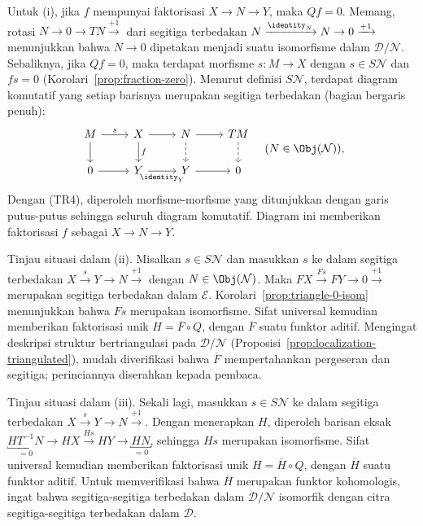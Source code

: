 \begin{bukti}
	Untuk (i), jika $f$ mempunyai faktorisasi $X \to N \to Y$, maka $Qf = 0$.
	Memang, rotasi $N \to 0 \to TN \xrightarrow{+1}$ dari segitiga terbedakan
	$N \xrightarrow{\identity_N} N \to 0 \xrightarrow{+1}$ menunjukkan bahwa
	$N \to 0$ dipetakan menjadi suatu isomorfisme dalam
	$\mathcal{D}/\mathcal{N}$. Sebaliknya, jika $Qf = 0$, maka terdapat morfisme
	$s: M \to X$ dengan $s \in S\mathcal{N}$ dan $fs = 0$
	(Korolari~\ref{prop:fraction-zero}). Menurut definisi $S\mathcal{N}$,
	terdapat diagram komutatif yang setiap barisnya merupakan segitiga
	terbedakan (bagian bergaris penuh):
	\[\begin{tikzcd}
		M \arrow[r, "s"] \arrow[d] & X \arrow[d, "f"] \arrow[r] & N \arrow[r] \arrow[dashed, d] & TM \arrow[dashed, d] \\
		0 \arrow[r] & Y \arrow[r, "{\identity_Y}"'] & Y \arrow[r] & 0
	\end{tikzcd} \quad (N \in \Obj(\mathcal{N})), \]
	Dengan (TR4), diperoleh morfisme-morfisme yang ditunjukkan dengan garis
	putus-putus sehingga seluruh diagram komutatif. Diagram ini memberikan
	faktorisasi $f$ sebagai $X \to N \to Y$.

	Tinjau situasi dalam (ii). Misalkan $s \in S\mathcal{N}$ dan masukkan $s$
	ke dalam segitiga terbedakan
	$X \xrightarrow{s} Y \to N \xrightarrow{+1}$ dengan
	$N \in \Obj(\mathcal{N})$. Maka
	$FX \xrightarrow{Fs} FY \to 0 \xrightarrow{+1}$ merupakan segitiga
	terbedakan dalam $\mathcal{E}$. Korolari~\ref{prop:triangle-0-isom}
	menunjukkan bahwa $Fs$ merupakan isomorfisme. Sifat universal kemudian
	memberikan faktorisasi unik $H = \overline{F} \circ Q$, dengan
	$\overline{F}$ suatu funktor aditif. Mengingat deskripsi struktur
	bertriangulasi pada $\mathcal{D}/\mathcal{N}$
	(Proposisi~\ref{prop:localization-triangulated}), mudah diverifikasi bahwa
	$\overline{F}$ mempertahankan pergeseran dan segitiga; perinciannya
	diserahkan kepada pembaca.

	Tinjau situasi dalam (iii). Sekali lagi, masukkan $s \in S\mathcal{N}$ ke
	dalam segitiga terbedakan $X \xrightarrow{s} Y \to N \xrightarrow{+1}$.
	Dengan menerapkan $H$, diperoleh barisan eksak
	$\underbracket{HT^{-1} N}_{=0} \to HX \xrightarrow{Hs} HY \to
	\underbracket{HN}_{=0}$, sehingga $Hs$ merupakan isomorfisme. Sifat universal
	kemudian memberikan faktorisasi unik $H = \overline{H} \circ Q$, dengan
	$\overline{H}$ suatu funktor aditif. Untuk memverifikasi bahwa $\overline{H}$
	merupakan funktor kohomologis, ingat bahwa segitiga-segitiga terbedakan dalam
	$\mathcal{D}/\mathcal{N}$ isomorfik dengan citra segitiga-segitiga
	terbedakan dalam $\mathcal{D}$.
\end{bukti}

